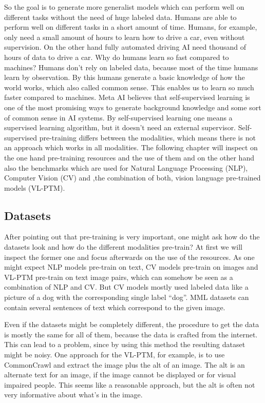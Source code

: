 \documentclass[
]{krantz}
\begin{document}
So the goal is to generate more generalist models which can perform well on different tasks without the need of huge labeled data. Humans are able to perform well on different tasks in a short amount of time. Humans, for example, only need a small amount of hours to learn how to drive a car, even without supervision. On the other hand fully automated driving AI need thousand of hours of data to drive a car. Why do humans learn so fast compared to machines?
Humans don't rely on labeled data, because most of the time humans learn by observation. By this humans generate a basic knowledge of how the world works, which also called common sense. This enables us to learn so much faster compared to machines.
Meta AI \citep{darkMatter} believes that self-supervised learning is one of the most promising ways to generate background knowledge and some sort of common sense in AI systems. By self-supervised learning one means a supervised learning algorithm, but it doesn't need an external supervisor. Self-supervised pre-training differs between the modalities, which means there is not an approach which works in all modalities.
The following chapter will inspect on the one hand pre-training resources and the use of them and on the other hand also the benchmarks which are used for Natural Language Processing (NLP), Computer Vision (CV) and ,the combination of both, vision language pre-trained models (VL-PTM).

\hypertarget{datasets}{%
\subsection{Datasets}\label{datasets}}

After pointing out that pre-training is very important, one might ask how do the datasets look and how do the different modalities pre-train? At first we will inspect the former one and focus afterwards on the use of the resources. As one might expect NLP models pre-train on text, CV models pre-train on images and VL-PTM pre-train on text image pairs, which can somehow be seen as a combination of NLP and CV. But CV models mostly used labeled data like a picture of a dog with the corresponding single label ``dog''. MML datasets can contain several sentences of text which correspond to the given image.

Even if the datasets might be completely different, the procedure to get the data is mostly the same for all of them, because the data is crafted from the internet. This can lead to a problem, since by using this method the resulting dataset might be noisy. One approach for the VL-PTM, for example, is to use CommonCrawl and extract the image plus the alt of an image. The alt is an alternate text for an image, if the image cannot be displayed or for visual impaired people. This seems like a reasonable approach, but the alt is often not very informative about what's in the image.
\end{document}
